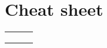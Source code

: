 \documentclass{article}
\begin{document}
\section*{Cheat sheet}
\begin{tabular}{| c | c | c | }
\hline
 & 
 & 
 \\
\hline
 & 
 & 
 \\
\hline
 & 
 & 
 \\
\hline
 & 
 & 
 \\
\hline
\end{tabular}
\end{document}
